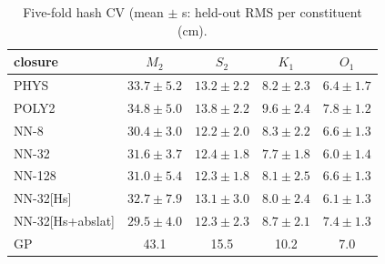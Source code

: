 \begin{table}[t]\centering\footnotesize
\caption{Five-fold hash CV (mean $\pm$ s: held-out RMS per constituent (cm).}
\label{tab:cvpc}
\begin{tabular}{lcccc}
\toprule
closure & $M_2$ & $S_2$ & $K_1$ & $O_1$ \\
\midrule
\textsc{PHYS} & $33.7\pm5.2$ & $13.2\pm2.2$ & $8.2\pm2.3$ & $6.4\pm1.7$ \\
\textsc{POLY2} & $34.8\pm5.0$ & $13.8\pm2.2$ & $9.6\pm2.4$ & $7.8\pm1.2$ \\
\textsc{NN-8} & $30.4\pm3.0$ & $12.2\pm2.0$ & $8.3\pm2.2$ & $6.6\pm1.3$ \\
\textsc{NN-32} & $31.6\pm3.7$ & $12.4\pm1.8$ & $7.7\pm1.8$ & $6.0\pm1.4$ \\
\textsc{NN-128} & $31.0\pm5.4$ & $12.3\pm1.8$ & $8.1\pm2.5$ & $6.6\pm1.3$ \\
\textsc{NN-32}[Hs] & $32.7\pm7.9$ & $13.1\pm3.0$ & $8.0\pm2.4$ & $6.1\pm1.3$ \\
\textsc{NN-32}[Hs+abslat] & $29.5\pm4.0$ & $12.3\pm2.3$ & $8.7\pm2.1$ & $7.4\pm1.3$ \\
GP & 43.1 & 15.5 & 10.2 & 7.0 \\
\bottomrule
\end{tabular}
\end{table}
